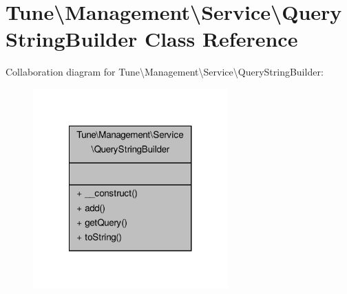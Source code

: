 \hypertarget{classTune_1_1Management_1_1Service_1_1QueryStringBuilder}{\section{Tune\textbackslash{}Management\textbackslash{}Service\textbackslash{}Query\-String\-Builder Class Reference}
\label{classTune_1_1Management_1_1Service_1_1QueryStringBuilder}
}


Collaboration diagram for Tune\textbackslash{}Management\textbackslash{}Service\textbackslash{}Query\-String\-Builder\-:
\nopagebreak
\begin{figure}[H]
\begin{center}
\leavevmode
\includegraphics[width=212pt]{classTune_1_1Management_1_1Service_1_1QueryStringBuilder__coll__graph}
\end{center}
\end{figure}

